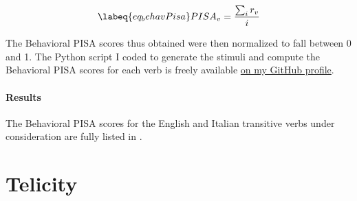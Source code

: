 \begin{equation} \labeq{eq_behavPisa}
PISA_{v} = \frac{\sum_{i} r_{v}}{i}
\end{equation}

The Behavioral PISA scores thus obtained were then normalized to fall between 0 and 1. The Python script I coded to generate the stimuli and compute the Behavioral PISA scores for each verb is freely available \href{https://github.com/giuliacappelli/behavioralPISA}{on my GitHub profile}.

\paragraph{Results} 
The Behavioral PISA scores for the English and Italian transitive verbs under consideration are fully listed in .\\ 

\section{Telicity} 


